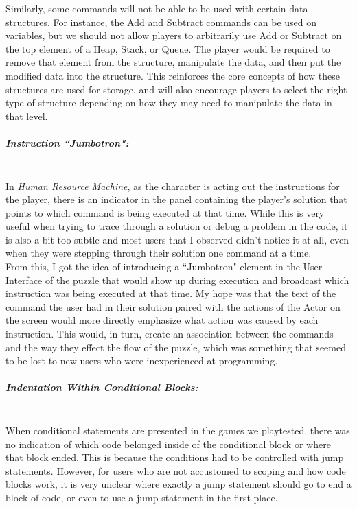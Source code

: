 Similarly, some commands will not be able to be used with certain data structures. For instance, the Add and Subtract
commands can be used on variables, but we should not allow players to arbitrarily use Add or Subtract on the
top element of a Heap, Stack, or Queue. The player would be required to remove that element from the structure,
manipulate the data, and then put the modified data into the structure. This reinforces the core concepts of how
these structures are used for storage, and will also encourage players to select the right type of structure depending
on how they may need to manipulate the data in that level.\\

\subparagraph{Instruction ``Jumbotron":}\mbox{} \\
In \textit{Human Resource Machine}, as the character is acting out the instructions for the player, there is an indicator
in the panel containing the player's solution that points to which command is being executed at that time. While this
is very useful when trying to trace through a solution or debug a problem in the code, it is also a bit too subtle
and most users that I observed didn't notice it at all, even when they were stepping through their solution one
command at a time.\\

From this, I got the idea of introducing a ``Jumbotron" element in the User Interface of the puzzle that would
show up during execution and broadcast which instruction was being executed at that time. My hope was that the
text of the command the user had in their solution paired with the actions of the Actor on the screen would more
directly emphasize what action was caused by each instruction. This would, in turn, create an association between
the commands and the way they effect the flow of the puzzle, which was something that seemed to be lost to new users
who were inexperienced at programming.\\

\subparagraph{Indentation Within Conditional Blocks:}\mbox{} \\
When conditional statements are presented in the games we playtested, there was no indication of which code
belonged inside of the conditional block or where that block ended. This is because the conditions had to be
controlled with jump statements. However, for users who are not accustomed to scoping and how code blocks
work, it is very unclear where exactly a jump statement should go to end a block of code, or even to use a jump
statement in the first place.\\

